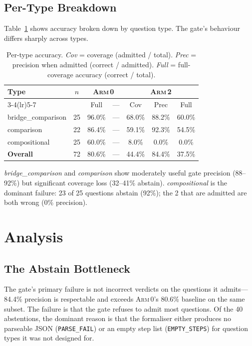 \documentclass[11pt]{article}
\newcommand{\armi}{\textsc{Arm\,0}}
\newcommand{\armii}{\textsc{Arm\,2}}
\begin{document}
\subsection{Per-Type Breakdown}

Table~\ref{tab:pertype} shows accuracy broken down by question type.
The gate's behaviour differs sharply across types.

\begin{table}[h]
\centering
\caption{Per-type accuracy. \emph{Cov} = coverage (admitted / total).
  \emph{Prec} = precision when admitted (correct / admitted).
  \emph{Full} = full-coverage accuracy (correct / total).}
\label{tab:pertype}
\begin{tabular}{lcccccc}
\toprule
\textbf{Type} & $n$ & \multicolumn{2}{c}{\armi{}} & \multicolumn{3}{c}{\armii{}} \\
\cmidrule(lr){3-4}\cmidrule(lr){5-7}
              &     & Full   & — & Cov    & Prec   & Full \\
\midrule
bridge\_comparison & 25 & 96.0\% & — & 68.0\% & 88.2\% & 60.0\% \\
comparison         & 22 & 86.4\% & — & 59.1\% & 92.3\% & 54.5\% \\
compositional      & 25 & 60.0\% & — &  8.0\% &  0.0\% &  0.0\% \\
\midrule
\textbf{Overall}   & 72 & 80.6\% & — & 44.4\% & 84.4\% & 37.5\% \\
\bottomrule
\end{tabular}
\end{table}

\emph{bridge\_comparison} and \emph{comparison} show moderately useful
gate precision (88--92\%) but significant coverage loss (32--41\%
abstain).  \emph{compositional} is the dominant failure: 23 of 25 questions
abstain (92\%); the 2 that are admitted are both wrong (0\% precision).

\section{Analysis}
\label{sec:analysis}

\subsection{The Abstain Bottleneck}

The gate's primary failure is not incorrect verdicts on the questions it
admits---84.4\% precision is respectable and exceeds \armi{}'s 80.6\%
baseline on the same subset.  The failure is that the gate refuses to admit
most questions.  Of the 40 abstentions, the dominant reason is that the
formaliser either produces no parseable JSON (\texttt{PARSE\_FAIL}) or an
empty step list (\texttt{EMPTY\_STEPS}) for question types it was not
designed for.
\end{document}
